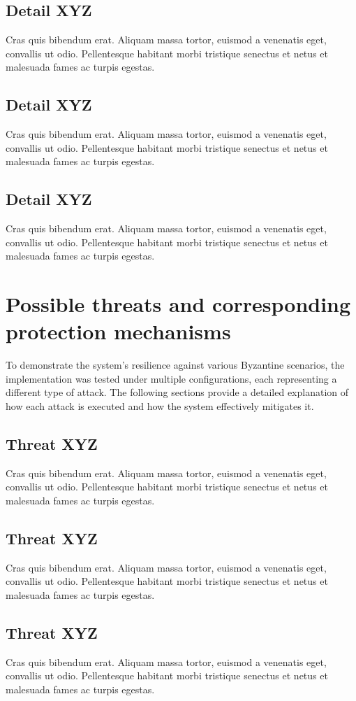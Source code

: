 \documentclass[runningheads]{llncs}
\begin{document}
\subsection{Detail XYZ}
Cras quis bibendum erat. Aliquam massa tortor, euismod a venenatis eget, convallis ut odio. Pellentesque habitant morbi tristique senectus et netus et malesuada fames ac turpis egestas.
%
\subsection{Detail XYZ}
Cras quis bibendum erat. Aliquam massa tortor, euismod a venenatis eget, convallis ut odio. Pellentesque habitant morbi tristique senectus et netus et malesuada fames ac turpis egestas.
%
\subsection{Detail XYZ}
Cras quis bibendum erat. Aliquam massa tortor, euismod a venenatis eget, convallis ut odio. Pellentesque habitant morbi tristique senectus et netus et malesuada fames ac turpis egestas.
%
\section{Possible threats and corresponding protection
mechanisms}
To demonstrate the system's resilience against various Byzantine scenarios, the implementation was tested under multiple configurations, each representing a different type of attack. The following sections provide a detailed explanation of how each attack is executed and how the system effectively mitigates it.
\subsection{Threat XYZ}
Cras quis bibendum erat. Aliquam massa tortor, euismod a venenatis eget, convallis ut odio. Pellentesque habitant morbi tristique senectus et netus et malesuada fames ac turpis egestas.
%
\subsection{Threat XYZ}
Cras quis bibendum erat. Aliquam massa tortor, euismod a venenatis eget, convallis ut odio. Pellentesque habitant morbi tristique senectus et netus et malesuada fames ac turpis egestas.
%
\subsection{Threat XYZ}
Cras quis bibendum erat. Aliquam massa tortor, euismod a venenatis eget, convallis ut odio. Pellentesque habitant morbi tristique senectus et netus et malesuada fames ac turpis egestas.
%
\end{document}
